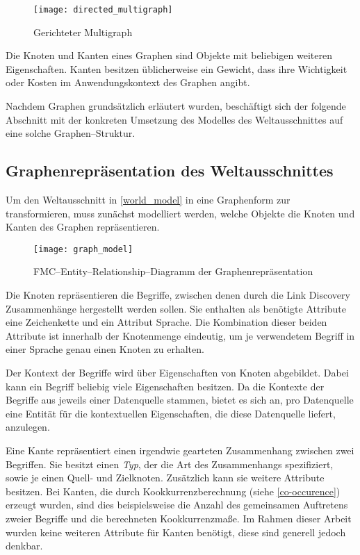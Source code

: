\begin{figure}[h]
\centering
\texttt{[image: directed\_multigraph]}
\caption{Gerichteter Multigraph}
\label{fig:directed_multigraph}
\end{figure}

Die Knoten und Kanten eines Graphen sind Objekte mit beliebigen weiteren Eigenschaften. Kanten besitzen üblicherweise ein Gewicht, dass ihre Wichtigkeit oder Kosten im Anwendungskontext des Graphen angibt.

Nachdem Graphen grundsätzlich erläutert wurden, beschäftigt sich der folgende Abschnitt mit der konkreten Umsetzung des Modelles des Weltausschnittes auf eine solche Graphen--Struktur.

\subsection{Graphenrepräsentation des Weltausschnittes}

Um den Weltausschnitt in \cref{world_model} in eine Graphenform zur transformieren, muss zunächst modelliert werden, welche Objekte die Knoten und Kanten des Graphen repräsentieren.

\begin{figure}
\centering
\texttt{[image: graph\_model]}
\caption{FMC--Entity--Relationship--Diagramm der Graphenrepräsentation}
\label{fig:graph_model}
\end{figure}

Die Knoten repräsentieren die Begriffe, zwischen denen durch die Link Discovery Zusammenhänge hergestellt werden sollen. Sie enthalten als benötigte Attribute eine Zeichenkette und ein Attribut Sprache. Die Kombination dieser beiden Attribute ist innerhalb der Knotenmenge eindeutig, um je verwendetem Begriff in einer Sprache genau einen Knoten zu erhalten.

Der Kontext der Begriffe wird über Eigenschaften von Knoten abgebildet. Dabei kann ein Begriff beliebig viele Eigenschaften besitzen. Da die Kontexte der Begriffe aus jeweils einer Datenquelle stammen, bietet es sich an, pro Datenquelle eine Entität für die kontextuellen Eigenschaften, die diese Datenquelle liefert, anzulegen.

Eine Kante repräsentiert einen irgendwie gearteten Zusammenhang zwischen zwei Begriffen. Sie besitzt einen \emph{Typ}, der die Art des Zusammenhangs spezifiziert, sowie je einen Quell- und Zielknoten. Zusätzlich kann sie weitere Attribute besitzen. Bei Kanten, die durch Kookkurrenzberechnung (siehe \cref{co-occurence}) erzeugt wurden, sind dies beispielsweise die Anzahl des gemeinsamen Auftretens zweier Begriffe und die berechneten Kookkurrenzmaße. Im Rahmen dieser Arbeit wurden keine weiteren Attribute für Kanten benötigt, diese sind generell jedoch denkbar.

